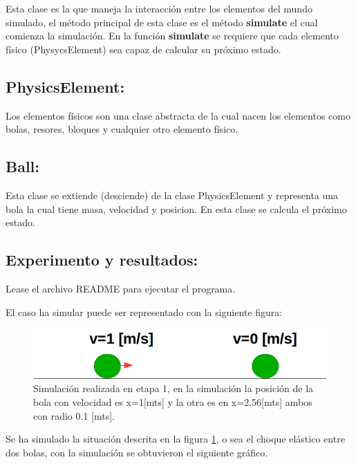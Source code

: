\documentclass[a4paper,10pt]{article}
\begin{document}
Esta clase es la que maneja la interacción entre los elementos del mundo simulado, el método principal de esta clase es el método \textbf{simulate}
el cual comienza la simulación. En la función \textbf{simulate} 
se requiere que cada elemento físico (PhysycsElement) sea capaz de calcular su próximo estado.\newline

\subsection{PhysicsElement:}


Los elementos físicos son una clase abstracta de la cual nacen los elementos como bolas, resores, bloques y cualquier otro elemento físico.\newline

\subsection{Ball:}


Esta clase se extiende (desciende) de la clase PhysicsElement y representa una bola la cual tiene masa, velocidad y posicion. En esta clase 
se calcula el próximo estado.\newline


\subsection{Experimento y resultados:}

Lease el archivo README para ejecutar el programa.\newline

El caso ha simular puede ser representado con la siguiente figura:

\begin{figure}[H]
 \centering
 \includegraphics[scale=0.3]{./FigureA.png}
 \caption{Simulación realizada en etapa 1, en la simulación la posición de la bola con velocidad es x=1[mts] y la otra es en x=2.56[mts] ambos con radio 0.1 [mts].}
  \label{etapa1.1}
\end{figure}


Se ha simulado la situación descrita en la figura \ref{etapa1.1}, o sea el choque elástico entre dos
bolas, con la simulación se obtuvieron el siguiente gráfico.
\end{document}
